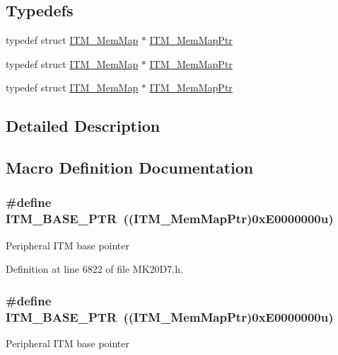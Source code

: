 \subsection*{Typedefs}
\begin{DoxyCompactItemize}
\item 
typedef struct \hyperlink{struct_i_t_m___mem_map}{I\+T\+M\+\_\+\+Mem\+Map} $\ast$ \hyperlink{group___i_t_m___peripheral_ga4a7413c0256960668a95765d8b74e5b3}{I\+T\+M\+\_\+\+Mem\+Map\+Ptr}
\item 
typedef struct \hyperlink{struct_i_t_m___mem_map}{I\+T\+M\+\_\+\+Mem\+Map} $\ast$ \hyperlink{group___i_t_m___peripheral_ga4a7413c0256960668a95765d8b74e5b3}{I\+T\+M\+\_\+\+Mem\+Map\+Ptr}
\item 
typedef struct \hyperlink{struct_i_t_m___mem_map}{I\+T\+M\+\_\+\+Mem\+Map} $\ast$ \hyperlink{group___i_t_m___peripheral_ga4a7413c0256960668a95765d8b74e5b3}{I\+T\+M\+\_\+\+Mem\+Map\+Ptr}
\end{DoxyCompactItemize}


\subsection{Detailed Description}


\subsection{Macro Definition Documentation}
\subsubsection[{\texorpdfstring{I\+T\+M\+\_\+\+B\+A\+S\+E\+\_\+\+P\+TR}{ITM_BASE_PTR}}]{\setlength{\rightskip}{0pt plus 5cm}\#define I\+T\+M\+\_\+\+B\+A\+S\+E\+\_\+\+P\+TR~(({\bf I\+T\+M\+\_\+\+Mem\+Map\+Ptr})0x\+E0000000u)}\hypertarget{group___i_t_m___peripheral_gafaddee8fe8b6a898d4e5edc43ee0d703}{}\label{group___i_t_m___peripheral_gafaddee8fe8b6a898d4e5edc43ee0d703}
Peripheral I\+TM base pointer 

Definition at line 6822 of file M\+K20\+D7.\+h.

\subsubsection[{\texorpdfstring{I\+T\+M\+\_\+\+B\+A\+S\+E\+\_\+\+P\+TR}{ITM_BASE_PTR}}]{\setlength{\rightskip}{0pt plus 5cm}\#define I\+T\+M\+\_\+\+B\+A\+S\+E\+\_\+\+P\+TR~(({\bf I\+T\+M\+\_\+\+Mem\+Map\+Ptr})0x\+E0000000u)}\hypertarget{group___i_t_m___peripheral_gafaddee8fe8b6a898d4e5edc43ee0d703}{}\label{group___i_t_m___peripheral_gafaddee8fe8b6a898d4e5edc43ee0d703}
Peripheral I\+TM base pointer 

